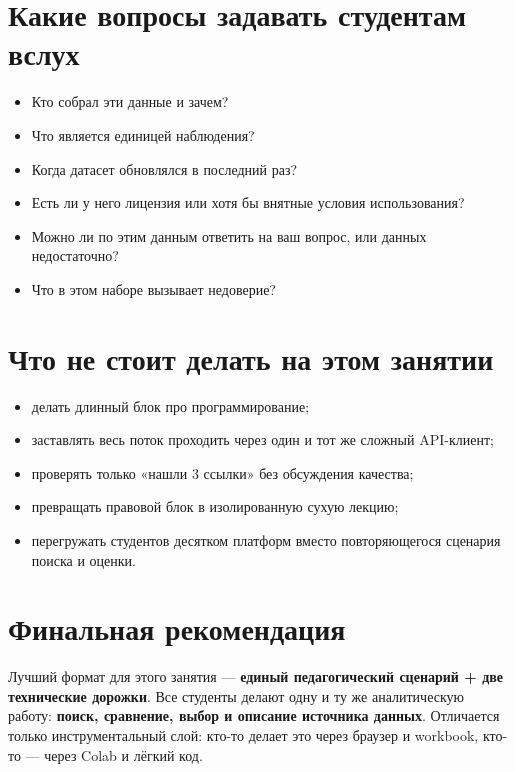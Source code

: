 \documentclass[11pt,a4paper]{article}
\begin{document}
\section{Какие вопросы задавать студентам вслух}

\begin{itemize}[leftmargin=1.2em]
\item Кто собрал эти данные и зачем?
\item Что является единицей наблюдения?
\item Когда датасет обновлялся в последний раз?
\item Есть ли у него лицензия или хотя бы внятные условия использования?
\item Можно ли по этим данным ответить на ваш вопрос, или данных недостаточно?
\item Что в этом наборе вызывает недоверие?
\end{itemize}

\section{Что не стоит делать на этом занятии}

\begin{itemize}[leftmargin=1.2em]
\item делать длинный блок про программирование;
\item заставлять весь поток проходить через один и тот же сложный API-клиент;
\item проверять только «нашли 3 ссылки» без обсуждения качества;
\item превращать правовой блок в изолированную сухую лекцию;
\item перегружать студентов десятком платформ вместо повторяющегося сценария поиска и оценки.
\end{itemize}

\section{Финальная рекомендация}

Лучший формат для этого занятия --- \textbf{единый педагогический сценарий + две технические дорожки}. Все студенты делают одну и ту же аналитическую работу: \textbf{поиск, сравнение, выбор и описание источника данных}. Отличается только инструментальный слой: кто-то делает это через браузер и workbook, кто-то --- через Colab и лёгкий код.
\end{document}
